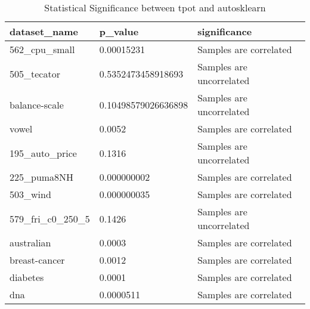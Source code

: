 \begin{table}[]
\centering
\begin{tabular}{|l|l|l|}
\hline
dataset\_name        & p\_value               & significance       \\ \hline
562\_cpu\_small      & 0.00015231             & Samples are correlated   \\ \hline
505\_tecator         & 0.5352473458918693     & Samples are uncorrelated \\ \hline
balance-scale        & 0.10498579026636898    & Samples are uncorrelated \\ \hline
vowel                & 0.0052                 & Samples are correlated   \\ \hline
195\_auto\_price     & 0.1316                 & Samples are uncorrelated \\ \hline
225\_puma8NH         & 0.000000002            & Samples are correlated   \\ \hline
503\_wind            & 0.000000035            & Samples are correlated   \\ \hline
579\_fri\_c0\_250\_5 & 0.1426                 & Samples are uncorrelated \\ \hline
australian           & 0.0003                 & Samples are correlated   \\ \hline
breast-cancer        & 0.0012                 & Samples are correlated   \\ \hline
diabetes             & 0.0001                 & Samples are correlated   \\ \hline
dna                  & 0.0000511              & Samples are correlated   \\ \hline
\end{tabular}
\caption{Statistical Significance between tpot and autosklearn}
\label{tbl:significance}
\end{table}